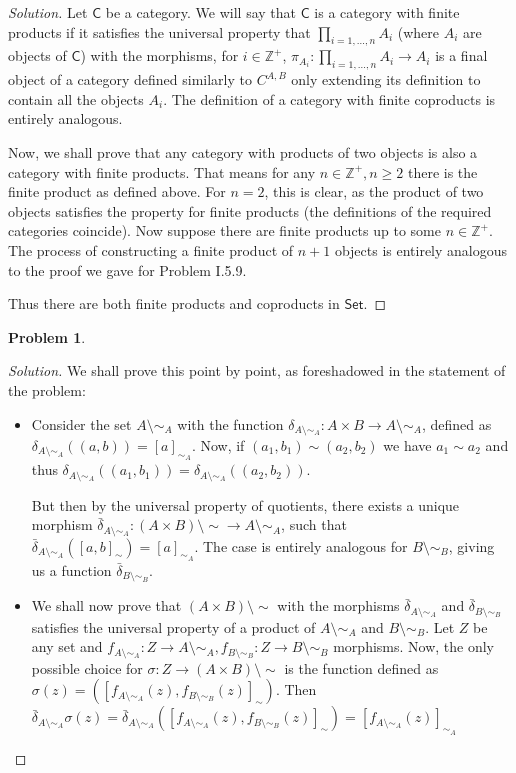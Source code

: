 \documentclass{article}
\theoremstyle{definition}
\newtheorem{problem-internal}{Problem}[subsection]
\newenvironment{problem}{
	\medskip
	\begin{problem-internal}
	}{
\end{problem-internal}
}
\newenvironment{solution}{
	\begin{proof}[Solution]
		\vspace{-8px}
		\setlength{\parskip}{4px}
		\setlength{\parindent}{0px}
	}{
\end{proof}
}
\newcommand{\C}{\mathsf{C}}
\begin{document}
\begin{solution}
	Let $\C$ be a category. We will say that $\C$ is a category with finite products if it satisfies the universal property that $\prod_{i=1,\dots, n} A_i$ (where $A_i$ are objects of $\C$) with the morphisms, for $i \in \mathbb{Z}^+$, $\pi_{A_i}: \prod_{i=1,\dots, n} A_i \to A_i$ is a final object of a category defined similarly to $C^{A,B}$ only extending its definition to contain all the objects $A_i$. The definition of a category with finite coproducts is entirely analogous.
	
	Now, we shall prove that any category with products of two objects is also a category with finite products. That means for any $n \in \mathbb{Z}^+, n \geq 2$ there is the finite product as defined above. For $n = 2$, this is clear, as the product of two objects satisfies the property for finite products (the definitions of the required categories coincide). Now suppose there are finite products up to some $n \in \mathbb{Z}^+$. The process of constructing a finite product of $n + 1$ objects is entirely analogous to the proof we gave for Problem I.5.9.
	
	Thus there are both finite products and coproducts in $\mathsf{Set}$.
\end{solution}

\begin{problem}
\end{problem}

\begin{solution}
	We shall prove this point by point, as foreshadowed in the statement of the problem:
	\begin{itemize}
		\item Consider the set $A\setminus\sim_A$ with the function $\delta_{A\setminus\sim_A}: A \times B \to A \setminus \sim_A$, defined as $\delta_{A\setminus\sim_A}((a,b)) = [a]_{\sim_A}$. Now, if $(a_1, b_1) \sim (a_2, b_2)$ we have $a_1 \sim a_2$ and thus $\delta_{A\setminus\sim_A}((a_1, b_1)) = \delta_{A\setminus\sim_A}((a_2,b_2))$. 
		
		But then by the universal property of quotients, there exists a unique morphism $\bar{\delta}_{A\setminus\sim_A}: (A \times B)\setminus\sim \to A\setminus\sim_A$, such that $\bar{\delta}_{A\setminus\sim_A}([a,b]_\sim)=[a]_{\sim_A}$. The case is entirely analogous for $B\setminus\sim_B$, giving us a function $\bar{\delta}_{B\setminus\sim_B}$.
		
		\item We shall now prove that $(A \times B)\setminus\sim$ with the morphisms $\bar{\delta}_{A\setminus\sim_A}$ and $\bar{\delta}_{B\setminus\sim_B}$ satisfies the universal property of a product of $A\setminus\sim_A$ and $B\setminus\sim_B$. Let $Z$ be any set and $f_{A\setminus\sim_A}: Z \to A\setminus\sim_A, f_{B\setminus\sim_B}: Z \to B\setminus\sim_B$ morphisms. Now, the only possible choice for $\sigma: Z \to (A \times B)\setminus\sim$ is the function defined as $\sigma(z) = ([f_{A\setminus\sim_A}(z), f_{B\setminus\sim_B}(z)]_\sim)$. Then $\bar{\delta}_{A\setminus\sim_A}\sigma(z)=\bar{\delta}_{A\setminus\sim_A}([f_{A\setminus\sim_A}(z), f_{B\setminus\sim_B}(z)]_\sim)=[f_{A\setminus\sim_A}(z)]_{\sim_A}$
	\end{itemize}
\end{solution}
\end{document}
